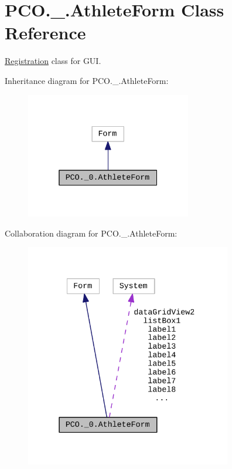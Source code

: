 \hypertarget{classPCO_1_1__0_1_1AthleteForm}{}\section{P\+C\+O.\+\_.\+Athlete\+Form Class Reference}
\label{classPCO_1_1__0_1_1AthleteForm}


\hyperlink{classRegistration}{Registration} class for G\+UI.  




Inheritance diagram for P\+C\+O.\+\_.\+Athlete\+Form\+:\nopagebreak
\begin{figure}[H]
\begin{center}
\leavevmode
\includegraphics[width=205pt]{classPCO_1_1__0_1_1AthleteForm__inherit__graph}
\end{center}
\end{figure}


Collaboration diagram for P\+C\+O.\+\_.\+Athlete\+Form\+:\nopagebreak
\begin{figure}[H]
\begin{center}
\leavevmode
\includegraphics[width=255pt]{classPCO_1_1__0_1_1AthleteForm__coll__graph}
\end{center}
\end{figure}
